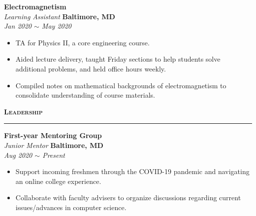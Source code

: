 \documentclass[10pt, letterpaper]{article}
\begin{document}
\begin{paracol}{2}
	\textbf{Electromagnetism}\\
	\textit{Learning Assistant}
	\switchcolumn
	\raggedleft\textbf{Baltimore, MD}\\
	\raggedleft\textit{Jan 2020 $\sim$ May 2020}
\end{paracol}
\vspace{-5mm}
\begin{itemize}
	\item TA for Physics II, a core engineering course. \vspace{-3mm}
	\item Aided lecture delivery, taught Friday sections to help students solve additional problems, and held office hours weekly.
	\vspace{-3mm}
	\item Compiled notes on mathematical backgrounds of electromagnetism to consolidate understanding of course materials.
\end{itemize}
\vspace{-3mm}

{\large \textbf{\textsc{Leadership}}}
\vspace{5pt}
\hrule

\begin{paracol}{2}
	\textbf{First-year Mentoring Group}\\
	\textit{Junior Mentor}
	\switchcolumn
	\raggedleft\textbf{Baltimore, MD}\\
	\raggedleft\textit{Aug 2020 $\sim$ Present}
\end{paracol}
\vspace{-5mm}
\begin{itemize}
	\item Support incoming freshmen through the COVID-19 pandemic and navigating an online college experience.
	\vspace{-3mm}
	\item Collaborate with faculty advisers to organize discussions regarding current issues/advances in computer science.
\end{itemize}
\vspace{-3mm}
\end{document}
